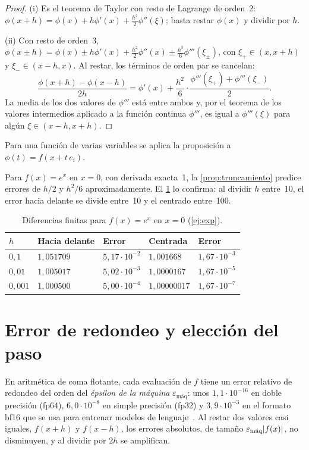 \begin{proof}
(i) Es el teorema de Taylor con resto de Lagrange de orden~2: $\phi(x+h)=\phi(x)+h\phi'(x)+\tfrac{h^{2}}{2}\phi''(\xi)$; basta restar $\phi(x)$ y dividir por $h$.

(ii) Con resto de orden~3, $\phi(x\pm h)=\phi(x)\pm h\phi'(x)+\tfrac{h^{2}}{2}\phi''(x)\pm\tfrac{h^{3}}{6}\phi'''(\xi_\pm)$, con $\xi_+\in(x,x+h)$ y $\xi_-\in(x-h,x)$. Al restar, los términos de orden par se cancelan:
\[
\frac{\phi(x+h)-\phi(x-h)}{2h}=\phi'(x)+\frac{h^{2}}{6}\cdot\frac{\phi'''(\xi_+)+\phi'''(\xi_-)}{2}.
\]
La media de los dos valores de $\phi'''$ está entre ambos y, por el teorema de los valores intermedios aplicado a la función continua $\phi'''$, es igual a $\phi'''(\xi)$ para algún $\xi\in(x-h,x+h)$.
\end{proof}

Para una función de varias variables se aplica la proposición a $\phi(t)=f(x+t\,e_i)$.

\begin{ejemplo}\label{ej:exp}
Para $f(x)=e^{x}$ en $x=0$, con derivada exacta~1, la \cref{prop:truncamiento} predice errores de $h/2$ y $h^{2}/6$ aproximadamente. El \cref{tab:exp} lo confirma: al dividir $h$ entre~10, el error hacia delante se divide entre~10 y el centrado entre~100.
\end{ejemplo}

\begin{table}[h]
\centering\small
\caption{Diferencias finitas para $f(x)=e^{x}$ en $x=0$ (\cref{ej:exp}).}\label{tab:exp}
\begin{tabular}{@{}lllll@{}}
\toprule
$h$ & Hacia delante & Error & Centrada & Error \\
\midrule
$0{,}1$ & $1{,}051709$ & $5{,}17\cdot 10^{-2}$ & $1{,}001668$ & $1{,}67\cdot 10^{-3}$ \\
$0{,}01$ & $1{,}005017$ & $5{,}02\cdot 10^{-3}$ & $1{,}0000167$ & $1{,}67\cdot 10^{-5}$ \\
$0{,}001$ & $1{,}000500$ & $5{,}00\cdot 10^{-4}$ & $1{,}00000017$ & $1{,}67\cdot 10^{-7}$ \\
\bottomrule
\end{tabular}
\end{table}

\section{Error de redondeo y elección del paso}

En aritmética de coma flotante, cada evaluación de $f$ tiene un error relativo de redondeo del orden del \emph{épsilon de la máquina} $\varepsilon_{\text{máq}}$: unos $1{,}1\cdot 10^{-16}$ en doble precisión (fp64), $6{,}0\cdot 10^{-8}$ en simple precisión (fp32) y $3{,}9\cdot 10^{-3}$ en el formato bf16 que se usa para entrenar modelos de lenguaje~\cite[§4.1]{gbc}. Al restar dos valores casi iguales, $f(x+h)$ y $f(x-h)$, los errores absolutos, de tamaño $\varepsilon_{\text{máq}}\lvert f(x)\rvert$, no disminuyen, y al dividir por $2h$ se amplifican.

